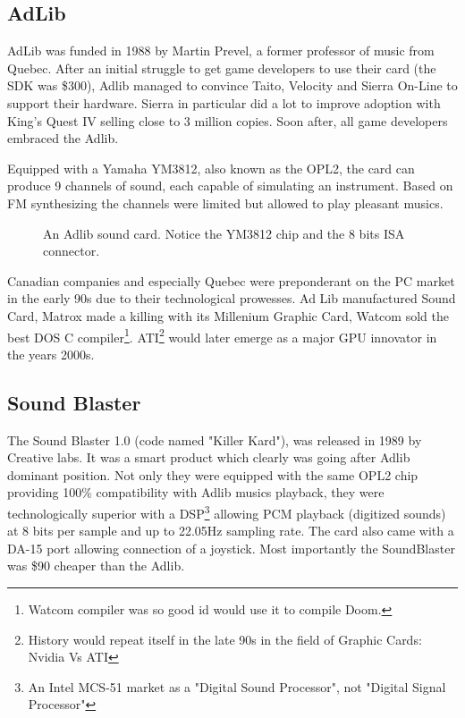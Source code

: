 \documentclass[book.tex]{subfiles}
\begin{document}
  \subsection{AdLib}
  AdLib was funded in 1988 by Martin Prevel, a former professor of music from Quebec. After an initial struggle to get game developers to use their card (the SDK was \$300), Adlib managed to convince Taito, Velocity and Sierra On-Line to support their hardware. Sierra in particular did a lot to improve adoption with King's Quest IV selling close to 3 million copies. Soon after, all game developers embraced the Adlib.\\
  \par
   Equipped with a Yamaha YM3812, also known as the OPL2, the card can produce 9 channels of sound, each capable of simulating an instrument. Based on FM synthesizing the channels were limited but allowed to play pleasant musics.\\
  \begin{figure}[H] 
    \centering 
    \caption{An Adlib sound card. Notice the YM3812 chip and the 8 bits ISA connector.}
  \end{figure}
   
\par
{} Canadian companies and especially Quebec were preponderant on the PC market in the early 90s due to their technological prowesses. Ad Lib manufactured Sound Card, Matrox made a killing with its Millenium Graphic Card, Watcom sold the best DOS C compiler\footnote{Watcom compiler was so good id would use it to compile Doom.}. ATI\footnote{History would repeat itself in the late 90s in the field of Graphic Cards: Nvidia Vs ATI} would later emerge as a major GPU innovator in the years 2000s.\\
  
  


  \subsection{Sound Blaster}
  The Sound Blaster 1.0 (code named "Killer Kard"), was released in 1989 by Creative labs. It was a smart product which clearly was going after Adlib dominant position. Not only they were equipped with the same OPL2 chip providing 100\% compatibility with Adlib musics playback, they were technologically superior with a DSP\footnote{An Intel MCS-51 market as a "Digital Sound Processor", not "Digital Signal Processor"}  allowing PCM playback (digitized sounds) at 8 bits per sample and up to 22.05Hz sampling rate. The card also came with a DA-15 port allowing connection of a joystick. Most importantly the SoundBlaster was \$90 cheaper than the Adlib.\\ 
\par
\end{document}
